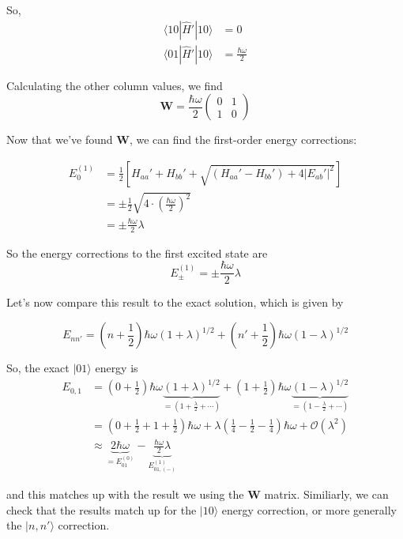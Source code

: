 \documentclass{article}
\newcommand{\ket}[1]{|#1 \rangle}
\newcommand{\inner}[2]{\langle #1 | #2 \rangle}
\begin{document}
So, 
\begin{align*}
  \inner{10}{\hat{H}'|10} &= 0 \\
  \inner{01}{\hat{H}'|10} &= \frac{\hbar \omega}{2} 
\end{align*}

Calculating the other column values, we find 
\[ \mathbf{W} = \frac{\hbar \omega}{2} \begin{pmatrix}
  0 & 1 \\
  1 & 0
\end{pmatrix}  \]

Now that we've found $\mathbf{W}$, we can find the first-order energy corrections:

\begin{align*}
  E_0^{(1)} &= \frac{1}{2} \left[ H_{aa}' + H_{bb}' + \sqrt{(H_{aa}' - H_{bb}') + 4|E_{ab}'|^2}  \right] \\
  &= \pm \frac{1}{2} \sqrt{4 \cdot \left( \frac{\hbar \omega}{2} \right)^2} \\
  &= \pm \frac{\hbar \omega}{2} \lambda
\end{align*}


So the energy corrections to the first excited state are 
\[ \boxed{E_{\pm}^{(1)} = \pm \frac{\hbar \omega}{2} \lambda} \]

\vskip 0.5cm
Let's now compare this result to the exact solution, which is given by 

\[ E_{nn'} = \left( n + \frac{1}{2} \right) \hbar \omega \left( 1 + \lambda \right)^{1/2} +  \left( n' + \frac{1}{2} \right) \hbar \omega \left( 1 - \lambda \right)^{1/2}   \]

\vskip 0.5cm
So, the exact $\ket{01}$ energy is 
\begin{align*}
  E_{0,1} &= \left( 0 + \frac{1}{2} \right) \hbar \omega \underbrace{\left( 1 + \lambda \right)^{1/2}}_{=\left( 1 + \frac{\lambda}{2} + \cdots \right)} + \left( 1 + \frac{1}{2} \right) \hbar \omega \underbrace{\left( 1 - \lambda \right)^{1/2}}_{=\left( 1 - \frac{\lambda}{2} + \cdots \right)} \\
  &= \left( 0 + \frac{1}{2} + 1 + \frac{1}{2} \right)\hbar \omega + \lambda \left( \frac{1}{4} - \frac{1}{2} - \frac{1}{4} \right) \hbar \omega + \mathcal{O}(\lambda^2) \\
  &\approx \underbrace{2\hbar \omega}_{=E_{01}^{(0)}} - \underbrace{\frac{\hbar \omega}{2} \lambda }_{E_{01,(-)}^{(1)}}
\end{align*}

and this matches up with the result we using the $\mathbf{W}$ matrix. Similiarly, we can check that the results match up for the $\ket{10}$ energy correction, or more generally the $\ket{n,n'}$ correction.
\end{document}

